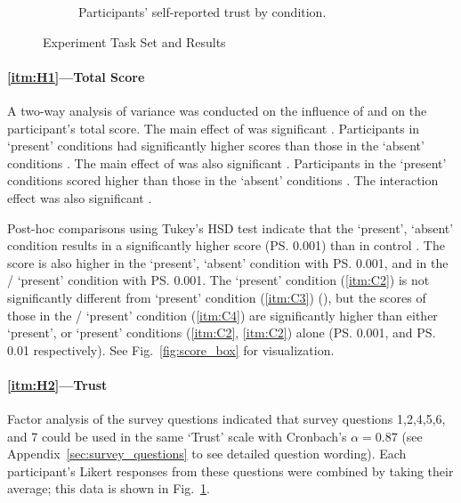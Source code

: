 \begin{figure}[tbp]
\begin{subfigure}[b]{0.30\linewidth}
        \caption{Participants' self-reported trust by condition.}
        \label{fig:trust_box}
    \end{subfigure} 
    \caption{Experiment Task Set and Results}
    \label{fig:taskset_results}
    \vspace{-0.5cm}
\end{figure}
\paragraph{\ref{itm:H1}---Total Score}
A two-way analysis of variance was conducted on the influence of \xQ{} and \xO{} on the participant's total score. The main effect of \xQ{} was significant . Participants in \xQ{} `present' conditions had significantly higher scores  than those in the \xQ{} `absent' conditions . The main effect of \xO{} was also significant . Participants in the \xO{} `present' conditions scored higher  than those in the \xO{} `absent' conditions . The interaction effect was also significant .

Post-hoc comparisons using Tukey's HSD test indicate that the \xQ{} `present', \xO{} `absent' condition  results in a significantly higher score (\ps{0.001}) than in control . The score is also higher  in the \xO{} `present', \xQ{} `absent' condition  with \ps{0.001}, and in the \xQ/\xO{} `present' condition  with \ps{0.001}. The \xQ{} `present' condition (\ref{itm:C2}) is not significantly different from \xO{} `present' condition (\ref{itm:C3}) (\pns), but the scores of those in the \xQ/\xO{} `present' condition (\ref{itm:C4}) are significantly higher than either \xQ{} `present', or \xO{} `present' conditions (\ref{itm:C2}, \ref{itm:C2}) alone (\ps{0.001}, and \ps{0.01} respectively). See Fig.~\ref{fig:score_box} for visualization.

\paragraph{\ref{itm:H2}---Trust}
Factor analysis of the survey questions indicated that survey questions 1,2,4,5,6, and 7 could be used in the same `Trust' scale with Cronbach's $\alpha = 0.87$ (see Appendix~\ref{sec:survey_questions} to see detailed question wording). Each participant's Likert responses from these questions were combined by taking their average; this data is shown in Fig.~\ref{fig:trust_box}.

